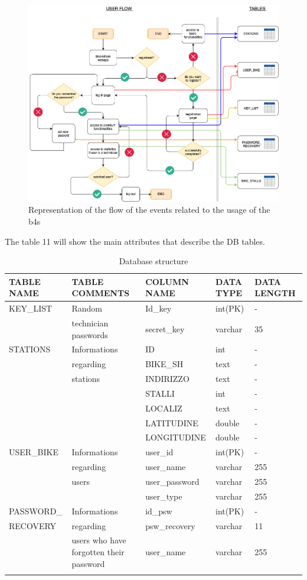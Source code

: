 \documentclass{article}
\begin{document}
\begin{figure}[H]
    \centering
    \includegraphics[width=0.99\linewidth]{image/flowchart.png}
    \caption{Representation of the flow of the events related to the usage of the b4s}
    \label{fig:flow}
\end{figure}

The table 11 will show the main attributes that describe the DB tables.
\\ 
\begin{longtable}{|p{}|p{}|l|p{}|p{}|}
 \hline TABLE NAME &   TABLE COMMENTS &    COLUMN NAME & DATA TYPE & DATA LENGTH    \\
 \hline
 KEY\_LIST &  Random  & Id\_key &int(PK)& - \\ 
 & technician passwords &  secret\_key & varchar & 35 \\
 \hline
 STATIONS  &   Informations   & ID &int & - \\
  & regarding & BIKE\_SH & text & - \\
  & stations & INDIRIZZO & text & - \\
  & & STALLI & int & - \\
  \hline
  \hline
  & & LOCALIZ & text & - \\
  & & LATITUDINE & double & - \\
  & & LONGITUDINE & double & - \\
 \hline
 USER\_BIKE &  Informations & user\_id & int(PK)& -\\
 & regarding & user\_name & varchar & 255 \\
 & users & user\_password & varchar & 255 \\
 & & user\_type & varchar & 255\\
 \hline 
 PASSWORD\_ &  Informations  & id\_psw & int(PK)& -\\
 RECOVERY & regarding & psw\_recovery & varchar & 11 \\
 & users who have forgotten their password & user\_name & varchar & 255 \\
 \hline
\caption{Database structure} \\
\end{longtable}
\end{document}
